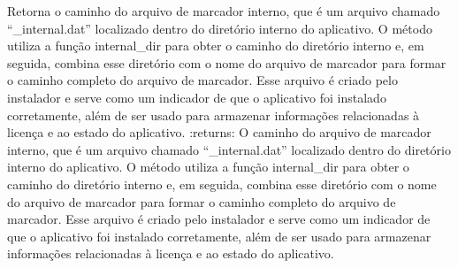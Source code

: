 \documentclass[letterpaper,10pt,english]{sphinxmanual}
\begin{document}
\begin{fulllineitems}
\label{\detokenize{api/simple_lock:simple_lock.internal_marker_path}}
\pysigstartsignatures
\pysiglinewithargsret
{}
{}
{}
\pysigstopsignatures
\sphinxAtStartPar
Retorna o caminho do arquivo de marcador interno, que é um arquivo chamado “\_internal.dat” localizado dentro do diretório interno do aplicativo. O método utiliza a função internal\_dir para obter o caminho do diretório interno e, em seguida, combina esse diretório com o nome do arquivo de marcador para formar o caminho completo do arquivo de marcador. Esse arquivo é criado pelo instalador e serve como um indicador de que o aplicativo foi instalado corretamente, além de ser usado para armazenar informações relacionadas à licença e ao estado do aplicativo.
:returns: O caminho do arquivo de marcador interno, que é um arquivo chamado “\_internal.dat” localizado dentro do diretório interno do aplicativo. O método utiliza a função internal\_dir para obter o caminho do diretório interno e, em seguida, combina esse diretório com o nome do arquivo de marcador para formar o caminho completo do arquivo de marcador. Esse arquivo é criado pelo instalador e serve como um indicador de que o aplicativo foi instalado corretamente, além de ser usado para armazenar informações relacionadas à licença e ao estado do aplicativo.
\begin{quote}\begin{description}
\sphinxAtStartPar
{}

\end{description}\end{quote}

\end{fulllineitems}

\end{document}
